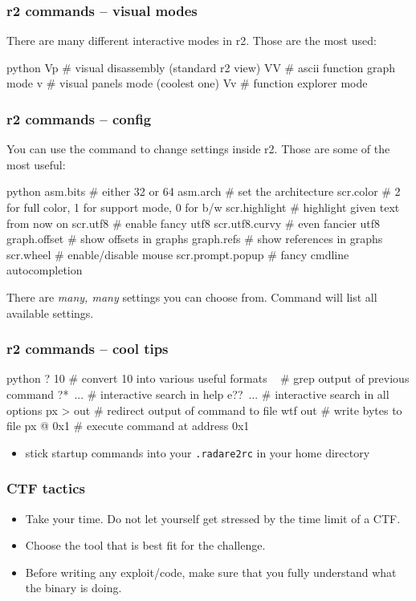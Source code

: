 \documentclass[aspectratio=169]{beamer}
\begin{document}
\begin{frame}[fragile]
	\frametitle{r2 commands -- visual modes}
	There are many different interactive modes in r2.
	Those are the most used:
	\begin{codebox}{python}
Vp       # visual disassembly (standard r2 view)
VV       # ascii function graph mode
v        # visual panels mode (coolest one)
Vv       # function explorer mode\end{codebox}
\end{frame}

\begin{frame}[fragile]
	\frametitle{r2 commands -- config}
	You can use the command  to change
	settings inside r2. Those are some of the most useful:
	\begin{codebox}{python}
asm.bits         # either 32 or 64
asm.arch         # set the architecture
scr.color        # 2 for full color, 1 for support mode, 0 for b/w
scr.highlight    # highlight given text from now on
scr.utf8         # enable fancy utf8
scr.utf8.curvy   # even fancier utf8
graph.offset     # show offsets in graphs
graph.refs       # show references in graphs
scr.wheel        # enable/disable mouse
scr.prompt.popup # fancy cmdline autocompletion\end{codebox}
	There are \emph{many, many} settings you can choose from. Command  
	will list all available settings.
\end{frame}


\begin{frame}[fragile]
	\frametitle{r2 commands -- cool tips}
	\begin{codebox}{python}
? 10     # convert 10 into various useful formats
~        # grep output of previous command
?*~...   # interactive search in help
e??~...  # interactive search in all options
px > out # redirect output of command to file
wtf out  # write bytes to file
px @ 0x1 # execute command at address 0x1\end{codebox}
	\begin{itemize}
		\item stick startup commands into your \texttt{.radare2rc} in your home directory
	\end{itemize}
\end{frame}

\begin{frame}[fragile]
	\frametitle{CTF tactics}
	\begin{itemize}
		\item Take your time. Do not let yourself get stressed by the time limit of a CTF.
		\item Choose the tool that is best fit for the challenge.
		\item Before writing any exploit/code, make sure that you fully understand what the binary is doing.
	\end{itemize}
\end{frame}
\end{document}
